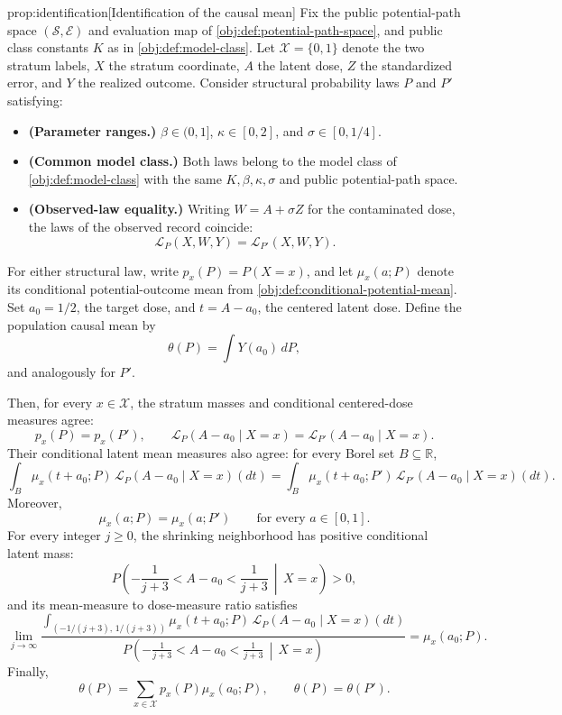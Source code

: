 \documentclass[11pt]{article}
\begin{document}
\begin{propositionv}{prop:identification}[Identification of the causal mean]
Fix the public potential-path space \((\mathcal S,\mathcal E)\) and evaluation map of \cref{obj:def:potential-path-space}, and public class constants \(K\) as in \cref{obj:def:model-class}. Let \(\mathcal X=\{0,1\}\) denote the two stratum labels, \(X\) the stratum coordinate, \(A\) the latent dose, \(Z\) the standardized error, and \(Y\) the realized outcome. Consider structural probability laws \(P\) and \(P'\) satisfying:
\begin{itemize}
\item \textbf{(Parameter ranges.)} \(\beta\in(0,1]\), \(\kappa\in[0,2]\), and \(\sigma\in[0,1/4]\).
\item \textbf{(Common model class.)} Both laws belong to the model class of \cref{obj:def:model-class} with the same \(K,\beta,\kappa,\sigma\) and public potential-path space.
\item \textbf{(Observed-law equality.)} Writing \(W=A+\sigma Z\) for the contaminated dose, the laws of the observed record coincide:
\[
\mathcal L_P(X,W,Y)=\mathcal L_{P'}(X,W,Y).
\]
\end{itemize}
For either structural law, write \(p_x(P)=P(X=x)\), and let \(\mu_x(a;P)\) denote its conditional potential-outcome mean from \cref{obj:def:conditional-potential-mean}. Set \(a_0=1/2\), the target dose, and \(t=A-a_0\), the centered latent dose. Define the population causal mean by
\[
\theta(P)=\int Y(a_0)\,dP,
\]
and analogously for \(P'\).

Then, for every \(x\in\mathcal X\), the stratum masses and conditional centered-dose measures agree:
\[
p_x(P)=p_x(P'),
\qquad
\mathcal L_P(A-a_0\mid X=x)
=
\mathcal L_{P'}(A-a_0\mid X=x).
\]
Their conditional latent mean measures also agree: for every Borel set \(B\subseteq\mathbb R\),
\[
\int_B \mu_x(t+a_0;P)\,
        \mathcal L_P(A-a_0\mid X=x)(dt)
=
\int_B \mu_x(t+a_0;P')\,
        \mathcal L_{P'}(A-a_0\mid X=x)(dt).
\]
Moreover,
\[
\mu_x(a;P)=\mu_x(a;P')
\qquad\text{for every }a\in[0,1].
\]
For every integer \(j\ge0\), the shrinking neighborhood has positive conditional latent mass:
\[
P\!\left(
-\frac1{j+3}<A-a_0<\frac1{j+3}
\,\middle|\,X=x
\right)>0,
\]
and its mean-measure to dose-measure ratio satisfies
\[
\lim_{j\to\infty}
\frac{
\displaystyle
\int_{(-1/(j+3),\,1/(j+3))}
\mu_x(t+a_0;P)\,
\mathcal L_P(A-a_0\mid X=x)(dt)
}{
\displaystyle
P\!\left(
-\frac1{j+3}<A-a_0<\frac1{j+3}
\,\middle|\,X=x
\right)
}
=
\mu_x(a_0;P).
\]
Finally,
\[
\theta(P)
=
\sum_{x\in\mathcal X}p_x(P)\mu_x(a_0;P),
\qquad
\theta(P)=\theta(P').
\]
\end{propositionv}
\end{document}
